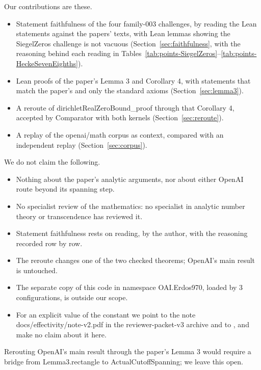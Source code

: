 Our contributions are these. %
\begin{itemize}
\item Statement faithfulness of the four family-003 challenges, by reading the Lean statements against the papers' texts, with Lean lemmas showing the SiegelZeros challenge is not vacuous (Section~\ref{sec:faithfulness}, with the reasoning behind each reading in Tables~\ref{tab:points-SiegelZeros}--\ref{tab:points-HeckeSevenEighths}). %
\item Lean proofs of the paper's Lemma 3 and Corollary 4, with statements that match the paper's and only the standard axioms (Section~\ref{sec:lemma3}). %
\item A reroute of dirichletRealZeroBound\_proof through that Corollary 4, accepted by Comparator with both kernels (Section~\ref{sec:reroute}). %
\item A replay of the openai/math corpus as context, compared with an independent replay (Section~\ref{sec:corpus}). %
\end{itemize}

We do not claim the following. %
\begin{itemize}
\item Nothing about the paper's analytic arguments, nor about either OpenAI route beyond its spanning step. %
\item No specialist review of the mathematics: no specialist in analytic number theory or transcendence has reviewed it. %
\item Statement faithfulness rests on reading, by the author, with the reasoning recorded row by row. %
\item The reroute changes one of the two checked theorems; OpenAI's main result is untouched. %
\item The separate copy of this code in namespace OAI.Erdos970, loaded by 3 configurations, is outside our scope. %
\item For an explicit value of the constant we point to the note docs/effectivity/note-v2.pdf in the reviewer-packet-v3 archive \cite{zenodo-23523697} and to \cite{arxiv-2610-15483}, and make no claim about it here. %
\end{itemize}

Rerouting OpenAI's main result through the paper's Lemma 3 would require a bridge from Lemma3.rectangle to ActualCutoffSpanning; we leave this open. %

